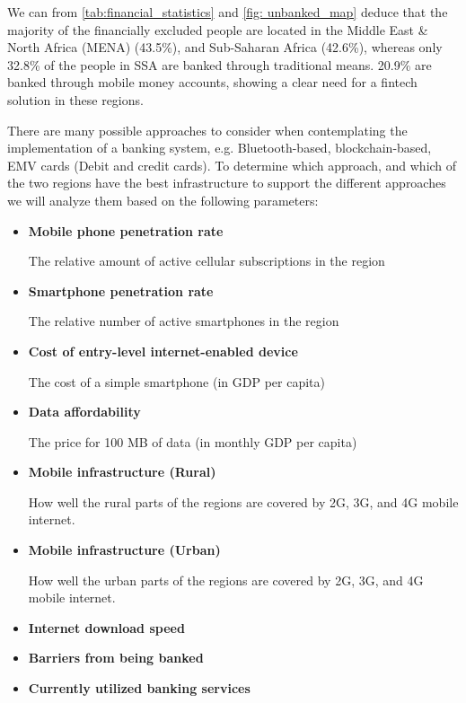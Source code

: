 \documentclass[11pt, a4paper]{article}
\begin{document}
We can from \autoref{tab:financial_statistics} and \autoref{fig: unbanked_map} deduce that the majority of the financially excluded people are located in the Middle East \& North Africa (MENA) (43.5\%), and Sub-Saharan Africa (42.6\%), whereas only 32.8\% of the people in SSA are banked through traditional means. 20.9\% are banked through mobile money accounts, showing a clear need for a fintech solution in these regions.

There are many possible approaches to consider when contemplating the implementation of a banking system, e.g. Bluetooth-based, blockchain-based, EMV cards (Debit and credit cards). To determine which approach, and which of the two regions have the best infrastructure to support the different approaches we will analyze them based on the following parameters:
\begin{itemize}
   \item \textbf{Mobile phone penetration rate}

   The relative amount of active cellular subscriptions in the region
   \item \textbf{Smartphone penetration rate}

   The relative number of active smartphones in the region
   \item \textbf{Cost of entry-level internet-enabled device}

   The cost of a simple smartphone (in GDP per capita)

   \item \textbf{Data affordability}

   The price for 100 MB of data (in monthly GDP per capita)

   \item \textbf{Mobile infrastructure (Rural)}

   How well the rural parts of the regions are covered by 2G, 3G, and 4G mobile internet.

   \item \textbf{Mobile infrastructure (Urban)}

   How well the urban parts of the regions are covered by 2G, 3G, and 4G mobile internet.

   \item \textbf{Internet download speed}

   \item \textbf{Barriers from being banked}

   \item \textbf{Currently utilized banking services}
 \end{itemize}
\end{document}
